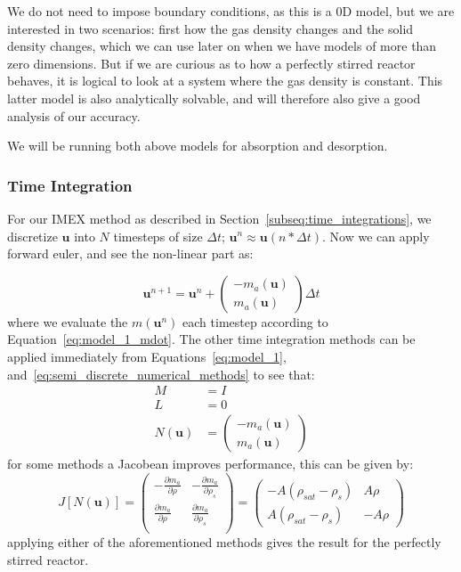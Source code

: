 We do not need to impose boundary conditions, as this is a 0D model, but we are interested in two scenarios: first how the gas density changes and the solid density changes, which we can use later on when we have models of more than zero dimensions. But if we are curious as to how a perfectly stirred reactor behaves, it is logical to look at a system where the gas density is constant. This latter model is also analytically solvable, and will therefore also give a good analysis of our accuracy. 

We will be running both above models for absorption and desorption.

\subsubsection*{Time Integration}
For our IMEX method as described in Section~\ref{subseq:time_integrations}, we discretize $\mathbf{u}$ into $N$ timesteps of size $\Delta t$; $\mathbf{u}^n\approx\mathbf{u}(n*\Delta t)$. Now we can apply forward euler, and see the non-linear part as:

\begin{equation*}
\mathbf{u}^{n+1}=\mathbf{u}^n +\begin{pmatrix} -{m}_a(\mathbf{u})\\ {m}_a(\mathbf{u})\end{pmatrix} \Delta t  
\end{equation*}
where we evaluate the $ m(\mathbf{u}^n)$ each timestep according to Equation~\ref{eq:model_1_mdot}. The other time integration methods can be applied immediately from Equations~\ref{eq:model_1}, and~\ref{eq:semi_discrete_numerical_methods} to see that:
\begin{equation}
    \begin{aligned}
        M &= I \\
        L &= 0 \\
        N(\mathbf u) &= \begin{pmatrix} -{m}_a(\mathbf{u})\\ {m}_a(\mathbf{u})\end{pmatrix} 
    \end{aligned}
\end{equation}
for some methods a Jacobean improves performance, this can be given by:
\begin{equation}
    J[N(\mathbf{u})]=\begin{pmatrix}
        -\frac{\partial {m}_a}{\partial \rho} & -\frac{\partial {m}_a}{\partial \rho_s}\\
        \frac{\partial {m}_a}{\partial \rho} & \frac{\partial {m}_a}{\partial \rho_s}\\
    \end{pmatrix} = 
    \begin{pmatrix}
        -A(\rho_{sat}-\rho_s) & A\rho \\
        A(\rho_{sat}-\rho_s) & -A\rho
    \end{pmatrix}
\end{equation}
applying either of the aforementioned methods gives the result for the perfectly stirred reactor.
